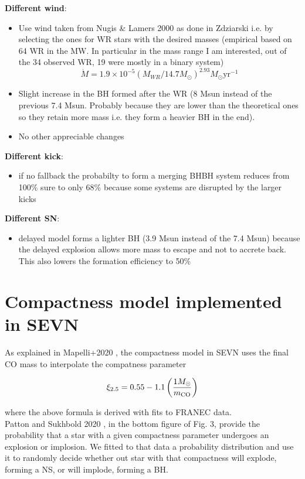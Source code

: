 \documentclass[a4paper,titlepage]{book}     	%
\newcommand{\sun}{\ensuremath{_\odot}}
\newcommand{\msun}{\ensuremath{M\sun}}
\newcommand{\yr}{\text{yr}}
\begin{document}
\textbf{Different wind}:\\
\begin{itemize}
	\item Use wind taken from Nugis \& Lamers 2000 as done in Zdziarski i.e. by selecting the ones for WR stars with the desired masses (empirical based on 64 WR in the MW. In particular in the mass range I am interested, out of the 34 observed WR, 19 were mostly in a binary system)
	\[\dot{M} = 1.9\times10^{-5}(M_{WR}/14.7\msun)^{2.93} \msun \yr^{-1}\]
	\item Slight increase in the BH formed after the WR (8 Msun instead of the previous 7.4 Msun. Probably because they are lower than the theoretical ones so they retain more mass i.e. they form a heavier BH in the end). 
	\item No other appreciable changes
\end{itemize}

\textbf{Different kick}:
\begin{itemize}
	\item if no fallback the probabilty to form a merging BHBH system reduces from 100\% sure to only 68\% because some systems are disrupted by the larger kicks
\end{itemize}


\textbf{Different SN}:
\begin{itemize}
	\item delayed model forms a lighter BH (3.9 Msun instead of the 7.4 Msun) because the delayed explosion allows more mass to escape and not to accrete back. This also lowers the formation efficiency to 50\% 
\end{itemize}



\section{Compactness model implemented in SEVN}
As explained in Mapelli+2020 \cite{mapelli2020_compactness}, the compactness model in SEVN uses the final CO mass to interpolate the compatness parameter

\begin{equation}
	\xi_{2.5} = 0.55 -1.1 \left(\frac{1 \msun}{m_{\rm CO}}\right)
\end{equation}

where the above formula is derived with fits to FRANEC data.\\

Patton and Sukhbold 2020 \cite{COcollapse}, in the bottom figure of Fig. 3, provide the probability that a star with a given compactness parameter undergoes an explosion or implosion. We fitted to that data a probability distribution and use it to randomly decide whether out star with that compactness will explode, forming a NS, or will implode, forming a BH.\\
\end{document}
